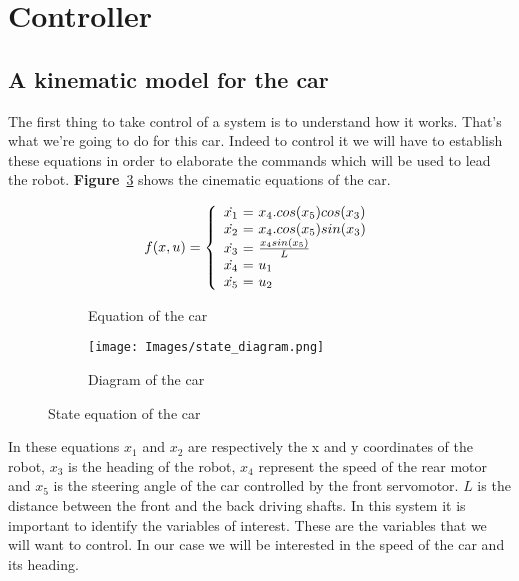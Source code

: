 \section{Controller}

\subsection{A kinematic model for the car}
The first thing to take control of a system is to understand how it
works. That's what we're going to do for this car. Indeed to control
it we will have to establish these equations in order to elaborate
the commands which will be used to lead the robot. \textbf{Figure}~\ref{fig:state}
shows the cinematic equations of the car.

\begin{figure}[!ht]
    \centering
    \begin{subfigure}[b]{0.45\textwidth}
        \centering
        
            $$ f(x, u) = \left \{
            \begin{array}{c @{=} l}
                \dot{x_1}\ & \ x_4.cos(x_5) cos(x_3) \\
                \dot{x_2}\ & \ x_4.cos(x_5) sin(x_3) \\
                \dot{x_3}\ & \ \frac{x_4 sin(x_5)}{L} \\
                \dot{x_4}\ & \ u_1 \\
                \dot{x_5}\ & \ u_2 
            \end{array}
            \right. $$
        
        \caption{Equation of the car}
        \label{eqn:state}
    \end{subfigure}
    \hfill
    \begin{subfigure}[b]{0.45\textwidth}
        \centering
        \texttt{[image: Images/state\_diagram.png]}
        \caption{Diagram of the car}
        \label{fig:raspi_config}
    \end{subfigure}
    \caption{State equation of the car}
    \label{fig:state}
\end{figure}



In these equations $x_1$ and $x_2$ are respectively the x and y
coordinates of the robot, $x_3$ is the heading of the robot, $x_4$
represent the speed of the rear motor and $x_5$ is the steering angle
of the car controlled by the front servomotor. $L$ is the distance between
the front and the back driving shafts. In this system it is
important to identify the variables of interest. These are the variables
that we will want to control. In our case we will be interested in the 
speed of the car and its heading.

